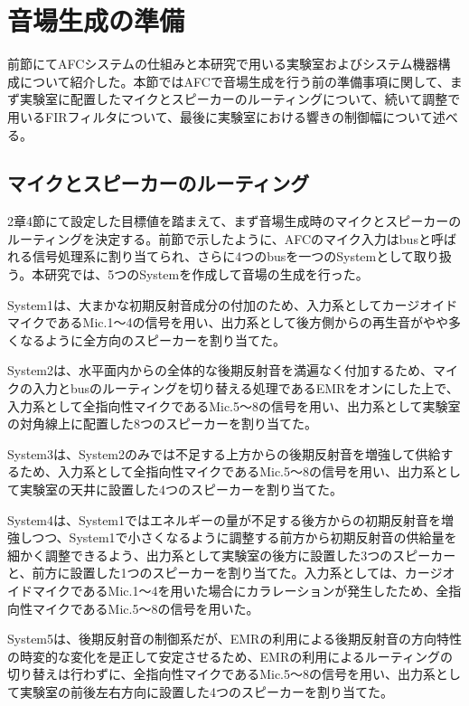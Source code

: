 \documentclass[11pt,a4j]{jreport}
\begin{document}
\section{音場生成の準備}
前節にてAFCシステムの仕組みと本研究で用いる実験室およびシステム機器構成について紹介した。本節ではAFCで音場生成を行う前の準備事項に関して、まず実験室に配置したマイクとスピーカーのルーティングについて、続いて調整で用いるFIRフィルタについて、最後に実験室における響きの制御幅について述べる。

\subsection*{マイクとスピーカーのルーティング}
2章4節にて設定した目標値を踏まえて、まず音場生成時のマイクとスピーカーのルーティングを決定する。前節で示したように、AFCのマイク入力はbusと呼ばれる信号処理系に割り当てられ、さらに4つのbusを一つのSystemとして取り扱う。本研究では、5つのSystemを作成して音場の生成を行った。

System1は、大まかな初期反射音成分の付加のため、入力系としてカージオイドマイクであるMic.1〜4の信号を用い、出力系として後方側からの再生音がやや多くなるように全方向のスピーカーを割り当てた。

System2は、水平面内からの全体的な後期反射音を満遍なく付加するため、マイクの入力とbusのルーティングを切り替える処理であるEMRをオンにした上で、入力系として全指向性マイクであるMic.5〜8の信号を用い、出力系として実験室の対角線上に配置した8つのスピーカーを割り当てた。

System3は、System2のみでは不足する上方からの後期反射音を増強して供給するため、入力系として全指向性マイクであるMic.5〜8の信号を用い、出力系として実験室の天井に設置した4つのスピーカーを割り当てた。

System4は、System1ではエネルギーの量が不足する後方からの初期反射音を増強しつつ、System1で小さくなるように調整する前方から初期反射音の供給量を細かく調整できるよう、出力系として実験室の後方に設置した3つのスピーカーと、前方に設置した1つのスピーカーを割り当てた。入力系としては、カージオイドマイクであるMic.1〜4を用いた場合にカラレーションが発生したため、全指向性マイクであるMic.5〜8の信号を用いた。

System5は、後期反射音の制御系だが、EMRの利用による後期反射音の方向特性の時変的な変化を是正して安定させるため、EMRの利用によるルーティングの切り替えは行わずに、全指向性マイクであるMic.5〜8の信号を用い、出力系として実験室の前後左右方向に設置した4つのスピーカーを割り当てた。
\end{document}
